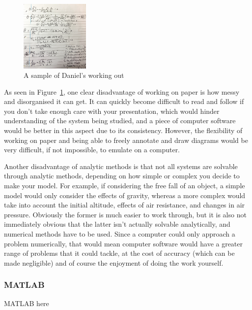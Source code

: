 \documentclass[11pt]{article}
\begin{document}
            \begin{figure}[!ht]
                \begin{center}
                    \includegraphics[width=0.3\textwidth]{figures/daniel_working.jpeg}
                \end{center}
                \caption{A sample of Daniel's working out}
                \label{fig:daniel_working}
            \end{figure}

            As seen in Figure~\ref{fig:daniel_working}, one clear disadvantage of working on paper is how messy and disorganised it can get. It can quickly become difficult to read and follow if you don't take enough care with your presentation, which would hinder understanding of the system being studied, and a piece of computer software would be better in this aspect due to its consistency. However, the flexibility of working on paper and being able to freely annotate and draw diagrams would be very difficult, if not impossible, to emulate on a computer. 

            Another disadvantage of analytic methods is that not all systems are solvable through analytic methods, depending on how simple or complex you decide to make your model. For example, if considering the free fall of an object, a simple model would only consider the effects of gravity, whereas a more complex would take into account the initial altitude, effects of air resistance, and changes in air pressure. Obviously the former is much easier to work through, but it is also not immediately obvious that the latter isn't actually solvable analytically, and numerical methods have to be used. Since a computer could only approach a problem numerically, that would mean computer software would have a greater range of problems that it could tackle, at the cost of accuracy (which can be made negligible) and of course the enjoyment of doing the work yourself.

            \subsubsection{MATLAB}
                MATLAB here
\end{document}
